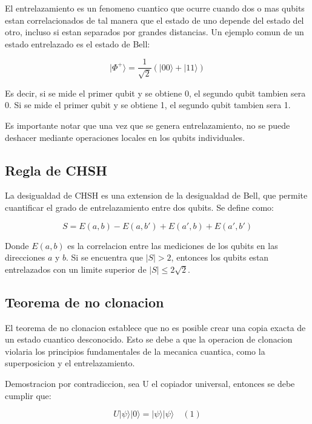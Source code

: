 \documentclass[11pt]{article}
\begin{document}
El entrelazamiento es un fenomeno cuantico que ocurre cuando dos o mas qubits estan correlacionados de tal manera que el estado de uno depende del estado del otro, incluso si estan separados por grandes distancias. Un ejemplo comun de un estado entrelazado es el estado de Bell:

\begin{equation}
    |\Phi^+\rangle = \frac{1}{\sqrt{2}} (|00\rangle + |11\rangle)
\end{equation}

Es decir, si se mide el primer qubit y se obtiene 0, el segundo qubit tambien sera 0. Si se mide el primer qubit y se obtiene 1, el segundo qubit tambien sera 1.

Es importante notar que una vez que se genera entrelazamiento, no se puede deshacer mediante operaciones locales en los qubits individuales.

\subsection{Regla de CHSH}

La desigualdad de CHSH es una extension de la desigualdad de Bell, que permite cuantificar el grado de entrelazamiento entre dos qubits. Se define como:

\begin{equation}
    S = E(a, b) - E(a, b') + E(a', b) + E(a', b')
\end{equation}

Donde $E(a, b)$ es la correlacion entre las mediciones de los qubits en las direcciones $a$ y $b$. Si se encuentra que $|S| > 2$, entonces los qubits estan entrelazados con un limite superior de $|S| \leq 2\sqrt{2}$.

\subsection{Teorema de no clonacion}

El teorema de no clonacion establece que no es posible crear una copia exacta de un estado cuantico desconocido. Esto se debe a que la operacion de clonacion violaria los principios fundamentales de la mecanica cuantica, como la superposicion y el entrelazamiento. 

Demostracion por contradiccion, sea U el copiador universal, entonces se debe cumplir que:

\begin{equation}
    U |\psi\rangle |0\rangle = |\psi\rangle |\psi\rangle \quad (1)
\end{equation}
\end{document}
